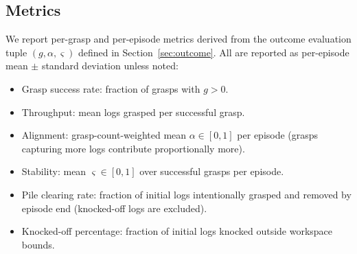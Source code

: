 \documentclass[conference]{IEEEtran}
\begin{document}
\subsection{Metrics}
\label{sec:metrics}
We report per-grasp and per-episode metrics derived from the outcome evaluation tuple $(g, \alpha, \varsigma)$ defined in Section~\ref{sec:outcome}. All are reported as per-episode mean $\pm$ standard deviation unless noted:
\begin{itemize}
    \item Grasp success rate: fraction of grasps with $g>0$.
    \item Throughput: mean logs grasped per successful grasp.
    \item Alignment: grasp-count-weighted mean $\alpha \in [0,1]$ per episode (grasps capturing more logs contribute proportionally more).
    \item Stability: mean $\varsigma \in [0,1]$ over successful grasps per episode.
    \item Pile clearing rate: fraction of initial logs intentionally grasped and removed by episode end (knocked-off logs are excluded).
    \item Knocked-off percentage: fraction of initial logs knocked outside workspace bounds.
\end{itemize}
\end{document}
